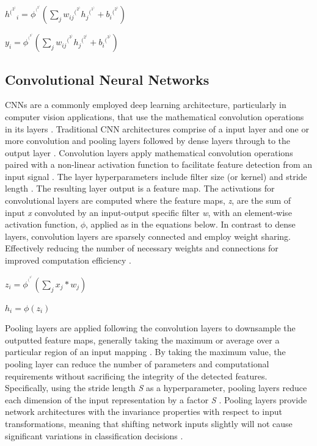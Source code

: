 \documentclass{article}
\begin{document}
\centerline{$h{^(^2^)}_{i} = \phi^{^(^2^)}(\sum_{j} w_{ij}{^(^2^)}h_j{^(^1^)} + b_i{^(^2^)})$}

\centerline{$y_{i} = \phi^{^(^3^)}(\sum_{j} w_{ij}{^(^3^)}h_j{^(^2^)} + b_i{^(^3^)})$ \cite{grosse2019lecture03}}




\subsection{Convolutional Neural Networks}
CNNs are a commonly employed deep learning architecture, particularly in computer vision applications, that use the mathematical convolution operations in its layers \cite{grosse2019lecture09}. Traditional CNN architectures comprise of a input layer and one or more convolution and pooling layers followed by dense layers through to the output layer \cite{amidi_amidi}. 
Convolution layers apply mathematical convolution operations paired with a non-linear activation function to facilitate feature detection from an input signal \cite{grosse2019lecture09}. The layer hyperparameters include filter size (or kernel) and stride length \cite{amidi_amidi}. The resulting layer output is a feature map.  The activations for convolutional layers are computed where the feature maps, \emph{z}, are the sum of input \emph{x} convoluted by an input-output specific filter \emph{w}, with an element-wise activation function, $\phi$, applied as in the equations below. In contrast to dense layers, convolution layers are sparsely connected and employ weight sharing. Effectively reducing the number of necessary weights and connections for improved computation efficiency \cite{grosse2019lecture09}. 
\newline
\newline
\centerline{$z_{i} = \phi^{^(^1^)}(\sum_{j} x_{j}*w_j)$}
\centerline{$h_i = \phi(z_i)$ \cite{grosse2019lecture09}}
\newline

Pooling layers are applied following the convolution layers to downsample the outputted feature maps, generally taking the maximum or average over a particular region of an input mapping \cite{grosse2019lecture09,amidi_amidi}. By taking the maximum value, the pooling layer can reduce the number of parameters and computational requirements without sacrificing the integrity of the detected features. Specifically, using the stride length \emph{S} as a hyperparameter, pooling layers reduce each dimension of the input representation by a factor \emph{S} \cite{grosse2019lecture09}. Pooling layers provide network architectures with the invariance properties with respect to input transformations, meaning that shifting network inputs slightly will not cause significant variations in classification decisions \cite{grosse2019lecture09}. 
\end{document}
